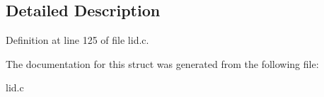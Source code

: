 \subsection{Detailed Description}


Definition at line 125 of file lid.\+c.



The documentation for this struct was generated from the following file\+:\begin{DoxyCompactItemize}
\item 
lid.\+c\end{DoxyCompactItemize}
